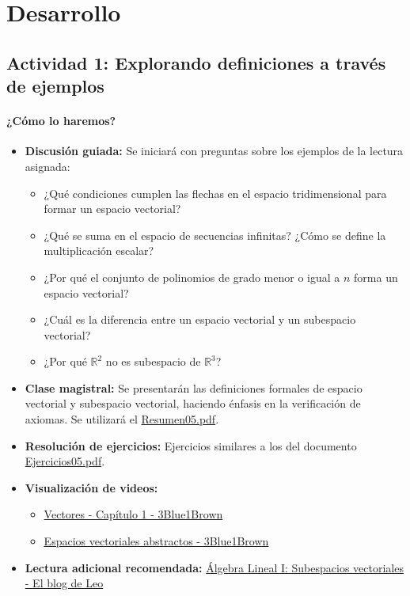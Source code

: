 \documentclass[a4,11pt]{aleph-notas}
\begin{document}
\section*{Desarrollo}

\subsection*{Actividad 1: Explorando definiciones a través de ejemplos}

\paragraph{¿Cómo lo haremos?}
\begin{itemize}[leftmargin=*]
\item \textbf{Discusión guiada:} Se iniciará con preguntas sobre los ejemplos de la lectura asignada:
\begin{itemize}
\item ¿Qué condiciones cumplen las flechas en el espacio tridimensional para formar un espacio vectorial?
\item ¿Qué se suma en el espacio de secuencias infinitas? ¿Cómo se define la multiplicación escalar?
\item ¿Por qué el conjunto de polinomios de grado menor o igual a $n$ forma un espacio vectorial?
\item ¿Cuál es la diferencia entre un espacio vectorial y un subespacio vectorial?
\item ¿Por qué $\mathbb{R}^2$ no es subespacio de $\mathbb{R}^3$?
\end{itemize}
\item \textbf{Clase magistral:} Se presentarán las definiciones formales de espacio vectorial y subespacio vectorial, haciendo énfasis en la verificación de axiomas. Se utilizará el \href{https://fcena-puce.github.io/AlgLinealyGeomAnalitica-05-N0068/2-Resumenes/Resumen05.pdf}{Resumen05.pdf}.
\item \textbf{Resolución de ejercicios:} Ejercicios similares a los del documento \href{https://fcena-puce.github.io/AlgLinealyGeomAnalitica-05-N0068/2-Ejercicios/Ejercicios05.pdf}{Ejercicios05.pdf}.
\item \textbf{Visualización de videos:}
\begin{itemize}
\item \href{https://www.youtube.com/watch?v=fNk\_zzaMoSs\&list=PLZHQObOWTQDPD3MizzM2xVFitgF8hE\_ab}{Vectores - Capítulo 1 - 3Blue1Brown}
\item \href{https://www.youtube.com/watch?v=TgKwz5Ikpc8}{Espacios vectoriales abstractos - 3Blue1Brown}
\end{itemize}
\item \textbf{Lectura adicional recomendada:} \href{https://blog.nekomath.com/algebra-lineal-i-subespacios-vectoriales/}{Álgebra Lineal I: Subespacios vectoriales - El blog de Leo}
\end{itemize}
\end{document}
